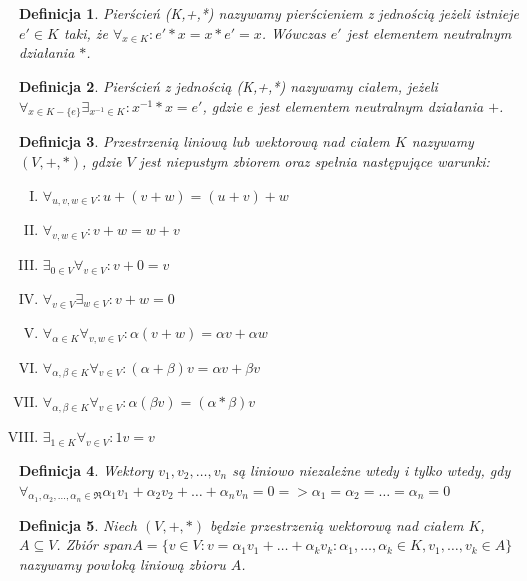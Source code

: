\documentclass[12pt,a4paper]{article}
\newtheorem{df}{Definicja}[section]
\begin{document}
\begin{df} 
Pier\'scie\'n (K,+,*) nazywamy pier\'scieniem z jedno\'sci\k{a} je\.zeli istnieje $e'\in K$ taki, \.ze $\forall_{x\in K}: e'*x=x*e'=x$. W\'owczas $e'$ jest elementem neutralnym dzia{\l}ania $*$.
\end{df}
\begin{df} 
Pier\'scie\'n z jedno\'sci\k{a} (K,+,*) nazywamy cia{\l}em, je\.zeli $\forall_{x\in K-\{e\}} \exists_{x^{-1}\in K}: x^{-1}*x=e'$, gdzie $e$ jest elementem neutralnym działania $+$.
\end{df}
\begin{df}
Przestrzeni\k{a} liniow\k{a} lub wektorow\k{a} nad cia{\l}em $K$ nazywamy $(V, +, *)$, gdzie $V$ jest niepustym zbiorem oraz spe{\l}nia nast\k{e}puj\k{a}ce warunki:
\begin{enumerate}[I.]
\item $\forall_{u, v, w \in V}: u + (v + w) = (u + v) + w$
\item $\forall_{v, w \in V}: v + w = w + v$
\item $\exists_{0 \in V} \forall_{v \in V}: v + 0 = v$
\item $\forall_{v \in V} \exists_{w \in V}: v + w = 0$
\item $\forall_{\alpha \in K} \forall_{v, w \in V}: \alpha(v + w) = \alpha v + \alpha w$
\item $\forall_{\alpha, \beta \in K} \forall_{v \in V}: (\alpha + \beta)v = \alpha v + \beta v$
\item $\forall_{\alpha, \beta \in K} \forall_{v \in V}: \alpha(\beta v) = (\alpha*\beta)v$
\item $\exists_{1 \in K} \forall_{v \in V}: 1v = v$
\end{enumerate}
\end{df}
\begin{df}
Wektory $v_{1}, v_{2}, \dots, v_{n}$ s\k{a} liniowo niezale\.{z}ne wtedy i tylko wtedy, gdy $\forall_{\alpha_{1}, \alpha_{2}, \dots, \alpha_{n} \in \Re} \alpha_{1}v_{1} + \alpha_{2}v_{2} + \dots + \alpha_{n}v_{n} = 0 => \alpha_{1} = \alpha_{2} = \dots = \alpha_{n} = 0$
\end{df}
\begin{df}
Niech $(V, +, *)$ b\k{e}dzie przestrzeni\k{a} wektorow\k{a} nad cia{\l}em $K$, $A\subseteq V$. Zbi\'or $spanA=\{v\in V: v=\alpha_{1}v_{1}+\ldots+\alpha_{k}v_{k}: \alpha_{1},\ldots,\alpha_{k}\in K, v_{1},\ldots,v_{k}\in A\}$ nazywamy pow{\l}ok\k{a} liniow\k{a} zbioru $A$.
\end{df}
\end{document}
